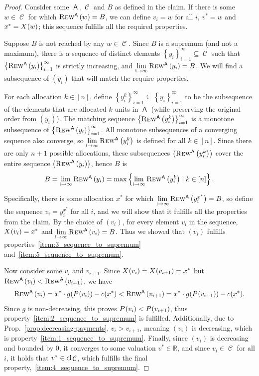 \documentclass[11pt,letterpaper]{article}
\newcommand{\set}[1]{\left\{#1\right\}}
\newcommand{\brackets}[1]{\left( #1 \right)}
\newcommand{\reals}{\mathbb{R}}
\newcommand{\sqrrange}[1]{[#1]}
\DeclareMathOperator{\A}{\auc{A}}
\DeclareMathOperator{\C}{\mathcal{C}}
\newcommand{\vstar}{{v^*}}
\newcommand{\xstar}{{x^*}}
\newcommand{\g}{g}
\DeclareMathOperator*{\mylim}{\lim\limits_{i\rightarrow\infty}}
\theoremstyle{plain}
\newcommand{\auc}[1]{\mathsf{#1}}
\begin{document}
\begin{proof}
    Consider some $\A,\C$ and $B$ as defined in the claim. If there is some $w\in\C$ for which $\trew[\A]{w}=B$, we can define $v_i=w$ for all $i$, $\vstar=w$ and $\xstar=\x{w}$; this sequence fulfills all the required properties.

    Suppose $B$ is not reached by any $w\in\C$. Since $B$ is a supremum (and not a maximum), there is a sequence of distinct elements $\set{y_i}_{i=1}^{\infty}\subseteq\C$ such that $\set{\trew[\A]{y_i}}_{i=1}^\infty$ is strictly increasing, and $\mylim \trew[\A]{y_i}=B$. We will find a subsequence of $\brackets{y_i}$ that will match the require properties.

    For each allocation $k\in\sqrrange{n}$, define $\set{y_i^k}_{i=1}^\infty\subseteq\set{y_i}_{i=1}^{\infty}$ to be the subsequence of the elements that are allocated $k$ units in $\A$ (while preserving the original order from $\brackets{y_i}$). The matching sequence $\set{\trew[\A]{y_i^k}}_{i=1}^\infty$ is a monotone subsequence of $\set{\trew[\A]{y_i}}_{i=1}^\infty$. All monotone subsequences of a converging sequence also converge, so $\mylim \trew[\A]{y_i^k}$ is defined for all $k\in\sqrrange{n}$. Since there are only $n+1$ possible allocations, these subsequences $\brackets{\trew[\A]{y_i^k}}$ cover the entire sequence $\brackets{\trew[\A]{y_i}}$, hence $B$ is
    \begin{align*}
        B=\mylim \trew[\A]{y_i}=\max\set{\mylim \trew[\A]{y_i^k}\mid k\in\sqrrange{n}}.
    \end{align*}

    Specifically, there is some allocation $\xstar$ for which $\mylim \trew[\A]{y_i^\xstar}=B$, so define the sequence $v_i=y_i^\xstar$ for all $i$, and we will show that it fulfills all the properties from the claim. By the choice of $(v_i)$, for every element $v_i$ in the sequence, $\x{v_i}=\xstar$ and $\mylim \trew[\A]{v_i}=B$. Thus we showed that $\brackets{v_i}$ fulfills properties~\ref{item:3_sequence_to_supremum} and~\ref{item:5_sequence_to_supremum}.

    Now consider some $v_i$ and $v_{i+1}$. Since $\x{v_i}=\x{v_{i+1}}=\xstar$ but $\trew[\A]{v_i}<\trew[\A]{v_{i+1}}$, we have
    \begin{align*}
        \trew[\A]{v_i}=\xstar\cdot\g(\p{v_i})-c(\xstar)<\trew[\A]{v_{i+1}}=\xstar\cdot\g(\p{v_{i+1}})-c(\xstar).
    \end{align*}
    Since $\g$ is non-decreasing, this proves $\p{v_i}<\p{v_{i+1}}$, thus property~\ref{item:2_sequence_to_supremum} is fulfilled. Additionally, due to Prop.~\ref{prop:decreasing-payments}, $v_i>v_{i+1}$, meaning $(v_i)$ is decreasing, which is property~\ref{item:1_sequence_to_supremum}. Finally, since $(v_i)$ is decreasing and bounded by 0, it converges to some valuation $\vstar\in\reals$, and since $v_i\in\C$ for all $i$, it holds that $\vstar\in\textnormal{cl}\C$, which fulfills the final property,~\ref{item:4_sequence_to_supremum}.
\end{proof}
\end{document}
